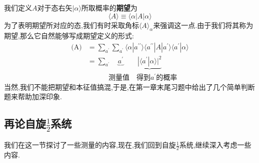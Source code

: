 我们定义$A$对于态右矢$|\alpha\rangle$所取概率的\textbf{期望}为
\begin{equation}
	\langle A\rangle\equiv\langle\alpha| A|\alpha\rangle 
\end{equation}
为了表明期望所对应的态,我们有时采取角标$\langle A\rangle_{\alpha}$来强调这一点.由于我们将其称为期望,那么它自然能够写成期望定义的形式:
\begin{equation}
	\begin{aligned}
		\text{(A)}& = \sum_{a^{\prime}} \sum_{a^{\prime}} \langle\alpha | a^{\prime\prime}\rangle \langle a^{\prime\prime} | A | a^{\prime} \rangle \langle a^{\prime} | \alpha\rangle  \\
		&=\sum_{a^{\prime}}\quad \underbrace{a^{\prime}}\qquad\underbrace{|\langle a^{\prime}|\alpha\rangle|^{2}} \\
		&\qquad\quad\text{测量值}\quad\text{得到}a^{\prime}\text{的概率}
	\end{aligned}
\end{equation}
当然,我们不能把期望和本征值搞混,于是,在第一章末尾习题中给出了几个简单判断题来帮助加深印象.
\subsection{再论自旋$\frac12$系统}
我们在这一节探讨了一些测量的内容,现在,我们回到自旋$\frac12$系统,继续深入考虑一些内容.

